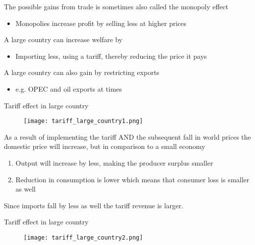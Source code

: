 \documentclass{beamer}
\begin{document}
\begin{frame}
 The possible gains from trade is sometimes also called the monopoly effect
 \begin{itemize}
   \item Monopolies increase profit by selling less at higher prices
 \end{itemize}
 \medskip
 A large country can increase welfare by
 \begin{itemize}
   \item Importing less, using a tariff, thereby reducing the price it pays
 \end{itemize}
 \medskip
 A large country can also gain by restricting exports
 \begin{itemize}
   \item e.g. OPEC and oil exports at times
 \end{itemize}
\end{frame}

\begin{frame}{Tariff effect in large country}
  \begin{figure}
    \texttt{[image: tariff\_large\_country1.png]}
  \end{figure}
\end{frame}

\begin{frame}
  As a result of implementing the tariff AND the subsequent fall in world prices the domestic price will increase, but in comparison to a small economy  
  \begin{enumerate}
    \item Output will increase by less, making the producer surplus smaller
    \item Reduction in consumption is lower which means that consumer loss is smaller as well
  \end{enumerate}
  \medskip
  Since imports fall by less as well the tariff revenue is larger.
\end{frame}

\begin{frame}{Tariff effect in large country}
  \begin{figure}
    \texttt{[image: tariff\_large\_country2.png]}
  \end{figure}
\end{frame}
\end{document}
